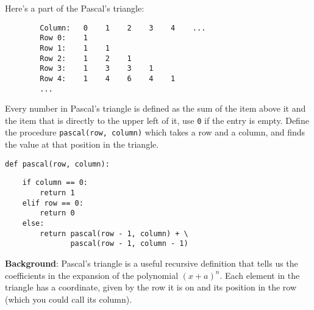 \question 
Here's a part of the Pascal's triangle:
\begin{lstlisting}
        Column:   0    1    2    3    4    ...
        Row 0:    1
        Row 1:    1    1
        Row 2:    1    2    1
        Row 3:    1    3    3    1
        Row 4:    1    4    6    4    1
        ...
\end{lstlisting}

Every number in Pascal's triangle is defined as the sum of the item
above it and the item that is directly to the upper left of it, use
{\tt 0} if the entry is empty.
Define the procedure {\tt pascal(row, column)} which takes a row and a column,
and finds the value at that position in the triangle. 

\begin{lstlisting}
def pascal(row, column):
\end{lstlisting}
\begin{solution}[2.3in]
\begin{lstlisting}
    if column == 0:
        return 1
    elif row == 0:
        return 0
    else:
        return pascal(row - 1, column) + \
               pascal(row - 1, column - 1)
\end{lstlisting}

\textbf{Background}: Pascal's triangle is a useful recursive definition that tells
us the coefficients in the expansion of the polynomial $(x + a)^n$.
Each element in the triangle has a coordinate, given by the row it
is on and its position in the row (which you could call its column).

\iffalse
If there is a position that does not have an entry, we treat it as
if we had a 0 there. Below are the first few rows of the triangle:
\fi

\end{solution}
